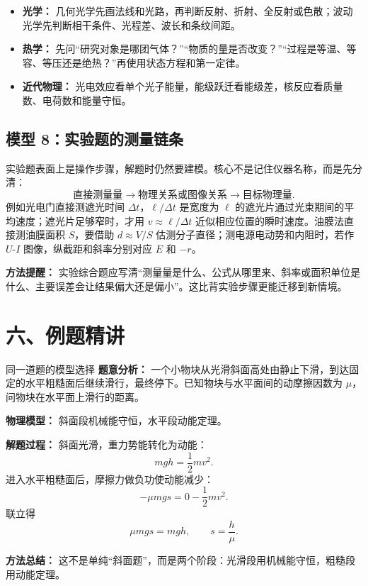 \begin{itemize}
  \item \textbf{光学：} 几何光学先画法线和光路，再判断反射、折射、全反射或色散；波动光学先判断相干条件、光程差、波长和条纹间距。
  \item \textbf{热学：} 先问“研究对象是哪团气体？”“物质的量是否改变？”“过程是等温、等容、等压还是绝热？”再使用状态方程和第一定律。
  \item \textbf{近代物理：} 光电效应看单个光子能量，能级跃迁看能级差，核反应看质量数、电荷数和能量守恒。
\end{itemize}

\subsection*{模型 8：实验题的测量链条}

实验题表面上是操作步骤，解题时仍然要建模。核心不是记住仪器名称，而是先分清：
\[
\text{直接测量量}\rightarrow\text{物理关系或图像关系}\rightarrow\text{目标物理量}.
\]
例如光电门直接测遮光时间 $\Delta t$，$\ell/\Delta t$ 是宽度为 $\ell$ 的遮光片通过光束期间的平均速度；遮光片足够窄时，才用 $v\approx \ell/\Delta t$ 近似相应位置的瞬时速度。油膜法直接测油膜面积 $S$，要借助 $d\approx V/S$ 估测分子直径；测电源电动势和内阻时，若作 $U$-$I$ 图像，纵截距和斜率分别对应 $E$ 和 $-r$。

\begin{center}


\label{fig:experiment-model-review}
\end{center}

\textbf{方法提醒：} 实验综合题应写清“测量量是什么、公式从哪里来、斜率或面积单位是什么、主要误差会让结果偏大还是偏小”。这比背实验步骤更能迁移到新情境。

\section*{六、例题精讲}

\begin{examplebox}{同一道题的模型选择}
\textbf{题意分析：} 一个小物块从光滑斜面高处由静止下滑，到达固定的水平粗糙面后继续滑行，最终停下。已知物块与水平面间的动摩擦因数为 $\mu$，问物块在水平面上滑行的距离。

\textbf{物理模型：} 斜面段机械能守恒，水平段动能定理。

\begin{center}

\end{center}

\textbf{解题过程：}
斜面光滑，重力势能转化为动能：
\[
mgh=\frac12mv^2.
\]
进入水平粗糙面后，摩擦力做负功使动能减少：
\[
-\mu mg s=0-\frac12mv^2.
\]
联立得
\[
\mu mg s=mgh,\qquad s=\frac{h}{\mu}.
\]

\textbf{方法总结：} 这不是单纯“斜面题”，而是两个阶段：光滑段用机械能守恒，粗糙段用动能定理。
\end{examplebox}

